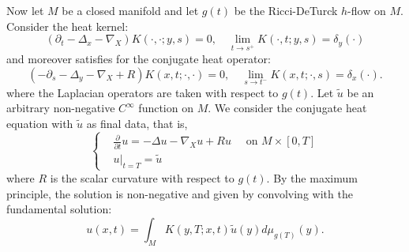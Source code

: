 \documentclass[12pt]{amsart}
\theoremstyle{plain}
\theoremstyle{plain}
\theoremstyle{definition}
\theoremstyle{remark}
\numberwithin{equation}{subsection}
\newcommand{\del}{\nabla}
\begin{document}
Now let $M$ be a closed manifold and let $g(t)$ be the Ricci-DeTurck $h$-flow on $M$. %
Consider the heat kernel:
\begin{equation*}
    \left(\partial_t - \Delta_x-\nabla_X\right)K(\cdot,\cdot;y,s) = 0, \quad \lim\limits_{t\to s^+}K(\cdot,t;y,s) = \delta_y(\cdot)
\end{equation*}
and moreover satisfies for the conjugate heat operator:
\begin{equation*}
    \left(-\partial_s - \Delta_y - \del_X + R\right)K(x,t;\cdot,\cdot) = 0, \quad \lim\limits_{s\to t^-}K(x,t;\cdot,s) = \delta_x(\cdot).
\end{equation*}
where the Laplacian operators are taken with respect to $g(t)$. Let $\tilde{u}$ be an arbitrary non-negative $C^\infty$ function on $M$. We consider the conjugate heat equation with $\tilde{u}$ as final data, that is,
\begin{equation}\label{eqn:conjugate-heat-eqn}
    \begin{cases}
        &\frac{\partial}{\partial t} u = -\Delta u - \del_X u + Ru \quad \text{ on } M \times[0,T] \\
        &u\big|_{t=T} = \tilde{u}
    \end{cases}
\end{equation}
where $R$ is the scalar curvature with respect to $g(t)$. By the maximum principle, the solution is non-negative and given by convolving with the fundamental solution:
\begin{equation*}
    u(x,t) = \int_M K(y,T;x,t)\tilde{u}(y)d\mu_{g(T)}(y).
\end{equation*}
\end{document}
